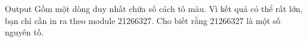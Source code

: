Output
Gồm một dòng duy nhất chứa số cách tô màu. Vì kết quả có thể rất lớn, bạn chỉ cần in ra theo module 21266327. Cho biết rằng 21266327 là một số nguyên tố.